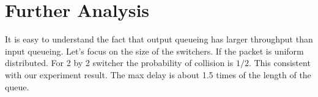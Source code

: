 \documentclass[letterpapper]{article}
\begin{document}
\section{Further Analysis}
It is easy to understand the fact that output queueing has larger throughput than input queueing. Let's focus on the size of the switchers. If the packet is uniform distributed. For 2 by 2 switcher the probability of collision is $1/2$. This consistent with our experiment result. The max delay is about 1.5 times of the length of the queue. 
\end{document}
